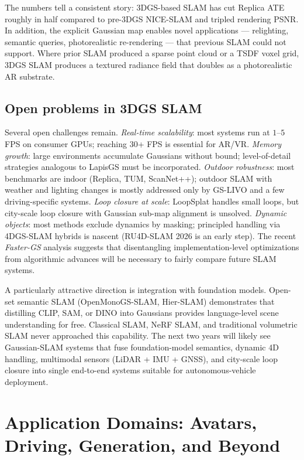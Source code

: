 \documentclass{article}
\begin{document}
The numbers tell a consistent story: 3DGS-based SLAM has cut Replica ATE roughly in half compared to pre-3DGS NICE-SLAM and tripled rendering PSNR. In addition, the explicit Gaussian map enables novel applications --- relighting, semantic queries, photorealistic re-rendering --- that previous SLAM could not support. Where prior SLAM produced a sparse point cloud or a TSDF voxel grid, 3DGS SLAM produces a textured radiance field that doubles as a photorealistic AR substrate.

\subsection{Open problems in 3DGS SLAM}\label{open-problems-in-3dgs-slam}

Several open challenges remain. \emph{Real-time scalability}: most systems run at \(1\)--\(5\) FPS on consumer GPUs; reaching \(30\)+ FPS is essential for AR/VR. \emph{Memory growth}: large environments accumulate Gaussians without bound; level-of-detail strategies analogous to LapisGS must be incorporated. \emph{Outdoor robustness}: most benchmarks are indoor (Replica, TUM, ScanNet++); outdoor SLAM with weather and lighting changes is mostly addressed only by GS-LIVO and a few driving-specific systems. \emph{Loop closure at scale}: LoopSplat handles small loops, but city-scale loop closure with Gaussian sub-map alignment is unsolved. \emph{Dynamic objects}: most methods exclude dynamics by masking; principled handling via 4DGS-SLAM hybrids is nascent (RU4D-SLAM 2026 is an early step). The recent \emph{Faster-GS} analysis \cite{hahlbohm2026fastergsanalyzinga} suggests that disentangling implementation-level optimizations from algorithmic advances will be necessary to fairly compare future SLAM systems.

A particularly attractive direction is integration with foundation models. Open-set semantic SLAM (OpenMonoGS-SLAM, Hier-SLAM) demonstrates that distilling CLIP, SAM, or DINO into Gaussians provides language-level scene understanding for free. Classical SLAM, NeRF SLAM, and traditional volumetric SLAM never approached this capability. The next two years will likely see Gaussian-SLAM systems that fuse foundation-model semantics, dynamic 4D handling, multimodal sensors (LiDAR + IMU + GNSS), and city-scale loop closure into single end-to-end systems suitable for autonomous-vehicle deployment.

\section{Application Domains: Avatars, Driving, Generation, and Beyond}\label{application-domains-avatars-driving-generation-and-beyond}
\end{document}
